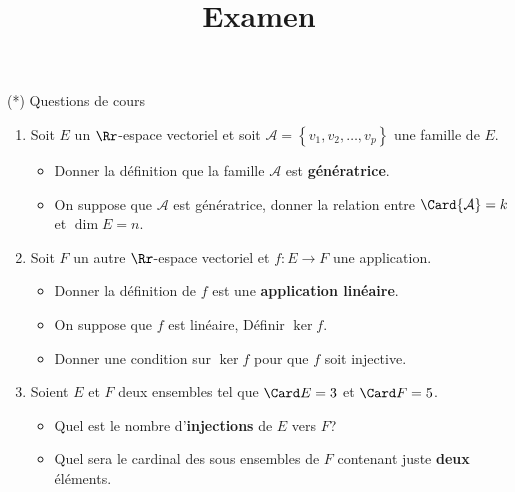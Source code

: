\documentclass[exam]{cs188}
\title{Examen}
\begin{document}
\newpage

\begin{problem}[4]{(*) Questions de cours}
    \begin{enumerate}
        \item  Soit $E$ un $\Rr$-espace vectoriel et soit $\mathcal{A}=\left\{v_1,v_2,\ldots,v_p\right\}$ une famille
            de $E$.
            \begin{itemize}
                \item Donner la définition que la famille $\mathcal{A}$ est
                    \textbf{génératrice}.
                \item On suppose que $\mathcal{A}$ est génératrice, donner la
                    relation entre $\Card{\mathcal{A}}=k$ et $\dim E=n$.
            \end{itemize}
        \item Soit $F$ un autre $\Rr$-espace vectoriel et $f:E\longrightarrow F$
            une application.

            \begin{itemize}
                \item Donner la définition de $f$ est une \textbf{application
                    linéaire}. 
                \item On suppose que $f$ est linéaire, Définir $\ker f$.
                \item Donner une condition sur $\ker f$ pour que $f$ soit injective.
            \end{itemize}
        \item Soient $E$ et $F$ deux ensembles tel que $\Card E=3$ et $\Card
            F=5$. 
            \begin{itemize}
                \item Quel est le nombre d'\textbf{injections} de $E$ vers $F$?
                \item Quel sera le cardinal des sous ensembles de $F$ contenant
                    juste \textbf{deux} éléments.
            \end{itemize}
    \end{enumerate}
\end{problem}
\end{document}
